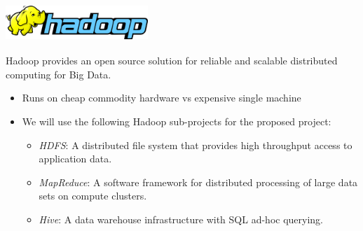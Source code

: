 \documentclass[hyperref={pdfpagelabels=false}]{beamer}
\begin{document}
\begin{frame}
\frametitle{\includegraphics[height=0.50in,
keepaspectratio=true]{./images/hadoop-logo.jpg}}

Hadoop provides an open source solution for reliable and scalable
distributed computing for Big Data.
\pause
\begin{itemize}
\item Runs on cheap commodity hardware vs expensive single machine
\pause
\item We will use the following Hadoop sub-projects for the proposed project:
\begin{itemize}
 \item \textit{HDFS}: A distributed file system that provides high throughput
access to application data.
 \item \textit{MapReduce}:  A software framework for distributed processing of
large data sets on compute clusters.
 \item \textit{Hive}: A data warehouse infrastructure with SQL ad-hoc querying.

\end{itemize}
\end{itemize}

\end{frame}
\end{document}
